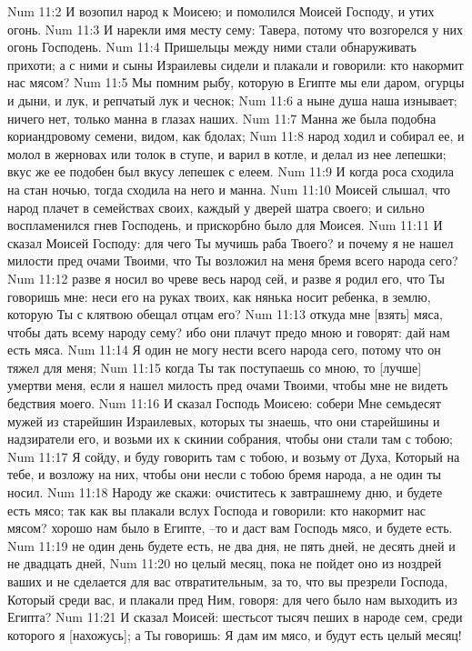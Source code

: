 Num 11:2  И возопил народ к Моисею; и помолился Моисей Господу, и утих огонь.
Num 11:3  И нарекли имя месту сему: Тавера, потому что возгорелся у них огонь Господень.
Num 11:4  Пришельцы между ними стали обнаруживать прихоти; а с ними и сыны Израилевы сидели и плакали и говорили: кто накормит нас мясом?
Num 11:5  Мы помним рыбу, которую в Египте мы ели даром, огурцы и дыни, и лук, и репчатый лук и чеснок;
Num 11:6  а ныне душа наша изнывает; ничего нет, только манна в глазах наших.
Num 11:7  Манна же была подобна кориандровому семени, видом, как бдолах;
Num 11:8  народ ходил и собирал ее, и молол в жерновах или толок в ступе, и варил в котле, и делал из нее лепешки; вкус же ее подобен был вкусу лепешек с елеем.
Num 11:9  И когда роса сходила на стан ночью, тогда сходила на него и манна.
Num 11:10  Моисей слышал, что народ плачет в семействах своих, каждый у дверей шатра своего; и сильно воспламенился гнев Господень, и прискорбно было для Моисея.
Num 11:11  И сказал Моисей Господу: для чего Ты мучишь раба Твоего? и почему я не нашел милости пред очами Твоими, что Ты возложил на меня бремя всего народа сего?
Num 11:12  разве я носил во чреве весь народ сей, и разве я родил его, что Ты говоришь мне: неси его на руках твоих, как нянька носит ребенка, в землю, которую Ты с клятвою обещал отцам его?
Num 11:13  откуда мне [взять] мяса, чтобы дать всему народу сему? ибо они плачут предо мною и говорят: дай нам есть мяса.
Num 11:14  Я один не могу нести всего народа сего, потому что он тяжел для меня;
Num 11:15  когда Ты так поступаешь со мною, то [лучше] умертви меня, если я нашел милость пред очами Твоими, чтобы мне не видеть бедствия моего.
Num 11:16  И сказал Господь Моисею: собери Мне семьдесят мужей из старейшин Израилевых, которых ты знаешь, что они старейшины и надзиратели его, и возьми их к скинии собрания, чтобы они стали там с тобою;
Num 11:17  Я сойду, и буду говорить там с тобою, и возьму от Духа, Который на тебе, и возложу на них, чтобы они несли с тобою бремя народа, а не один ты носил.
Num 11:18  Народу же скажи: очиститесь к завтрашнему дню, и будете есть мясо; так как вы плакали вслух Господа и говорили: кто накормит нас мясом? хорошо нам было в Египте, --то и даст вам Господь мясо, и будете есть.
Num 11:19  не один день будете есть, не два дня, не пять дней, не десять дней и не двадцать дней,
Num 11:20  но целый месяц, пока не пойдет оно из ноздрей ваших и не сделается для вас отвратительным, за то, что вы презрели Господа, Который среди вас, и плакали пред Ним, говоря: для чего было нам выходить из Египта?
Num 11:21  И сказал Моисей: шестьсот тысяч пеших в народе сем, среди которого я [нахожусь]; а Ты говоришь: Я дам им мясо, и будут есть целый месяц!
